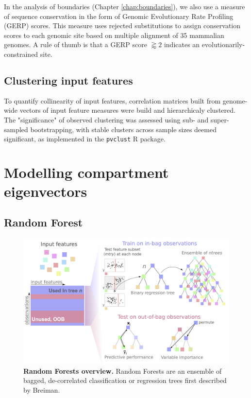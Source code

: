\documentclass[a4paper,11pt,oneside]{book}
\begin{document}
In the analysis of boundaries (Chapter \ref{chap:boundaries}), we also use a measure of sequence conservation in the form of Genomic Evolutionary Rate Profiling (GERP) scores. This measure uses rejected substitutions to assign conservation scores to each genomic site based on multiple alignment of 35 mammalian genomes.\cite{Cooper2005, Davydov2010a} A rule of thumb is that a GERP score $\gtrapprox 2$ indicates an evolutionarily-constrained site.\cite{Goode2010}

\subsection{Clustering input features}

To quantify collinearity of input features, correlation matrices built from genome-wide vectors of input feature measures were build and hierarchicaly clustered. The "significance" of observed clustering was assessed using sub- and super-sampled bootstrapping, with stable clusters across sample sizes deemed significant, as implemented in the \texttt{pvclust} R package.\cite{Suzuki2006a}

\section{Modelling compartment eigenvectors}\label{modelling}

\subsection{Random Forest}\label{sec:rf}

\begin{figure}
\begin{center}
\includegraphics[width=4.5in]{figs/randforests.png}
\captionsetup{width=\textwidth}
\caption[Random Forests overview.]{ {\bf Random Forests overview. } 
 Random Forests are an ensemble of bagged, de-correlated classification or regression trees first described by Breiman.\cite{Breiman2001a}
}\label{fig:randforests}
\end{center}
\end{figure} 
\end{document}
